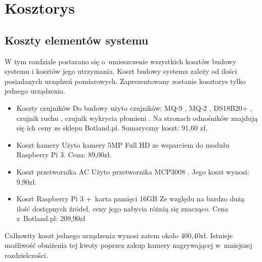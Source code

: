 \chapter{Kosztorys}

\section{Koszty elementów systemu}
W tym rozdziale postarano się o~umieszczenie wszystkich kosztów budowy systemu i kosztów jego utrzymania. Koszt budowy systemu zależy od ilości posiadanych urządzeń pomiarowych. Zaprezentowany zostanie kosztorys tylko jednego urządzenia.
\begin{itemize}
\item Koszty czujników \newline
Do budowy użyto czujników: MQ-9 \cite{specyfikacjaMQ-9}, MQ-2 \cite{specyfikacjaMQ-2}, DS18B20+ \cite{specyfikacjaTemp}, czujnik ruchu \cite{pir}, czujnik wykrycia płomieni \cite {specyfikacjaFlame}. Na stronach odnośników znajdują się ich ceny ze sklepu Botland.pl. Sumaryczny koszt: 91,60 zł.
\item Koszt kamery \newline
Użyto kamery 5MP Full HD ze wsparciem do modułu Raspberry Pi 3. Cena: 89,00zł.
\item Koszt przetwornika AC \newline
Użyto przetwornika MCP3008 \cite{specyfikacjaAC}. Jego koszt wynosi: 9,90zł.
\item Koszt Raspberry Pi 3 +~karta pamięci 16GB \newline
Ze względu na bardzo dużą ilość dostępnych źródeł, ceny jego nabycia różnią się znacząco. Cena z~Botland.pl: 209,90zł
\end{itemize}
Całkowity koszt jednego urządzenia wynosi zatem około 400,40zł. Istnieje możliwość obniżenia tej kwoty poprzez zakup kamery nagrywającej w~mniejszej rozdzielczości. 

